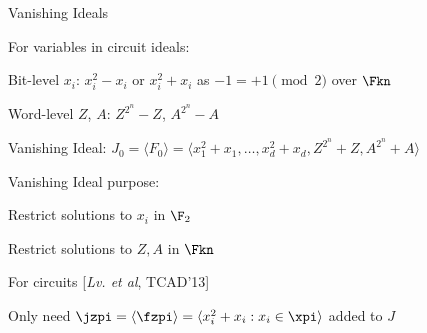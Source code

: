 \begin{frame}{\large Vanishing Ideals} %
\bi
	\item For variables in circuit ideals:
	\bi
		\item Bit-level $x_i$: $x_i^2 - x_i$ or $x_i^2 + x_i$ as $-1 = +1\pmod{2}$ over $\Fkn$
		\item Word-level $Z$, $A$: $Z^{2^n} - Z$, $A^{2^n} - A$
	\ei
	\vspace{0.1in}
	\item Vanishing Ideal: $J_0 = \langle F_0 \rangle =  \langle x_1^2+x_1,\dots,x_d^2+x_d, Z^{2^n}+Z, A^{2^n}+A\rangle$
	\vspace{0.1in}
	\item Vanishing Ideal purpose: 
	\bi
		\item Restrict solutions to $x_i$ in $\F_2$
		\item Restrict solutions to $Z,A$ in $\Fkn$
	\ei
	\vspace{0.1in}
	\item For circuits [{\it Lv. et al}, TCAD'13]
	\bi
		\item Only need $\jzpi = \langle \fzpi \rangle = \langle x_i^2 + x_i: x_i \in \xpi \rangle$ added to $J$ 
	\ei
\ei
\end{frame}


